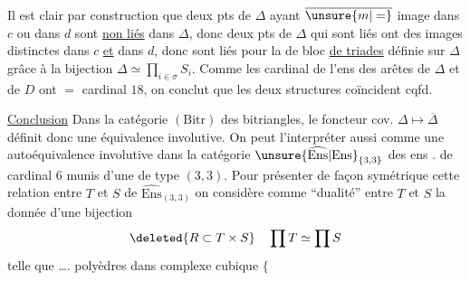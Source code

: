  Il est clair par construction que deux pts de $\Delta$ ayant $\overline{\unsure{m|=}}$ image dans $c$ ou dans $d$ sont \uline{non liés} dans $\Delta$, donc deux pts de $\Delta$ qui sont liés  ont des images distinctes dans $c$ \uline{et} dans $d$, donc sont liés pour la   de bloc \uline{de triades}  définie sur $\Delta$ grâce à la bijection $\Delta\simeq\prod_{i\in\sigma}S_i$. Comme les cardinal de l'ens des arêtes de $\Delta$ et de $D$ ont $=$ cardinal $18$, on conclut que les deux structures coïncident cqfd.

\uline{Conclusion} Dans la catégorie  $(\mathrm{Bitr})$ des bitriangles, le foncteur cov. $\Delta\longmapsto\overline\Delta$ définit donc une  équivalence involutive. On peut l'interpréter aussi comme une autoéquivalence involutive dans la catégorie $\unsure{\widehat{\mathrm{Ens}}|\mathrm{Ens}}_{\{3,3\}}$ des ens . de cardinal $6$ munis d'une   de type $(3,3)$. Pour présenter de façon symétrique cette relation entre $T$ et $S$ de $\widehat{\mathrm{Ens}}_{(3,3)}$ on considère comme ``dualité'' entre $T$ et $S$
la donnée d'une  bijection
\[
\deleted{R\subset T\times S}\quad\prod T\simeq\prod S
\]
telle que \ldots.
polyèdres dans complexe cubique $\Bigg\{$

